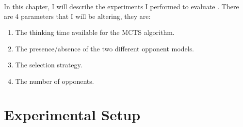 



In this chapter, I will describe the experiments I performed to evaluate \mbt. There are 4 parameters that I will be altering, they are:
\begin{enumerate}
\item The thinking time available for the MCTS algorithm. 
\item The presence/absence of the two different opponent models. 
\item The selection strategy.
\item The number of opponents.
\end{enumerate}



\section{Experimental Setup}					%






